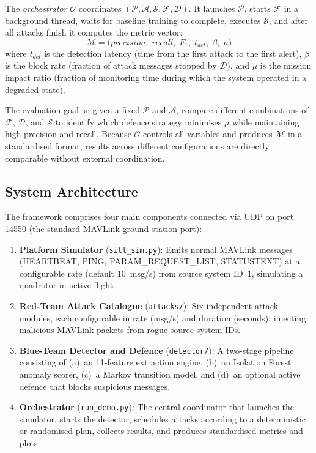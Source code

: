 The \emph{orchestrator} $\mathcal{O}$ coordinates $(\mathcal{P}, \mathcal{A}, \mathcal{S}, \mathcal{F}, \mathcal{D})$.
It launches $\mathcal{P}$, starts $\mathcal{F}$ in a background thread, waits for baseline training to complete, executes $\mathcal{S}$, and after all attacks finish it computes the metric vector:
\begin{equation}
\mathcal{M} = \bigl(\textit{precision},\; \textit{recall},\; F_1,\; t_{\textit{det}},\; \beta,\; \mu\bigr)
\end{equation}
where $t_{\textit{det}}$ is the detection latency (time from the first attack to the first alert), $\beta$ is the block rate (fraction of attack messages stopped by $\mathcal{D}$), and $\mu$ is the mission impact ratio (fraction of monitoring time during which the system operated in a degraded state).

The evaluation goal is: given a fixed $\mathcal{P}$ and $\mathcal{A}$, compare different combinations of $\mathcal{F}$, $\mathcal{D}$, and $\mathcal{S}$ to identify which defence strategy minimises $\mu$ while maintaining high precision and recall.
Because $\mathcal{O}$ controls all variables and produces $\mathcal{M}$ in a standardised format, results across different configurations are directly comparable without external coordination.


\subsection{System Architecture}

The framework comprises four main components connected via UDP on port 14550 (the standard MAVLink ground-station port):

\begin{enumerate}
    \item \textbf{Platform Simulator} (\texttt{sitl\_sim.py}): Emits normal MAVLink messages (HEARTBEAT, PING, PARAM\_REQUEST\_LIST, STATUSTEXT) at a configurable rate (default 10~msg/s) from source system ID~1, simulating a quadrotor in active flight.

    \item \textbf{Red-Team Attack Catalogue} (\texttt{attacks/}): Six independent attack modules, each configurable in rate (msg/s) and duration (seconds), injecting malicious MAVLink packets from rogue source system IDs.

    \item \textbf{Blue-Team Detector and Defence} (\texttt{detector/}): A two-stage pipeline consisting of (a)~an 11-feature extraction engine, (b)~an Isolation Forest anomaly scorer, (c)~a Markov transition model, and (d)~an optional active defence that blocks suspicious messages.

    \item \textbf{Orchestrator} (\texttt{run\_demo.py}): The central coordinator that launches the simulator, starts the detector, schedules attacks according to a deterministic or randomised plan, collects results, and produces standardised metrics and plots.
\end{enumerate}


